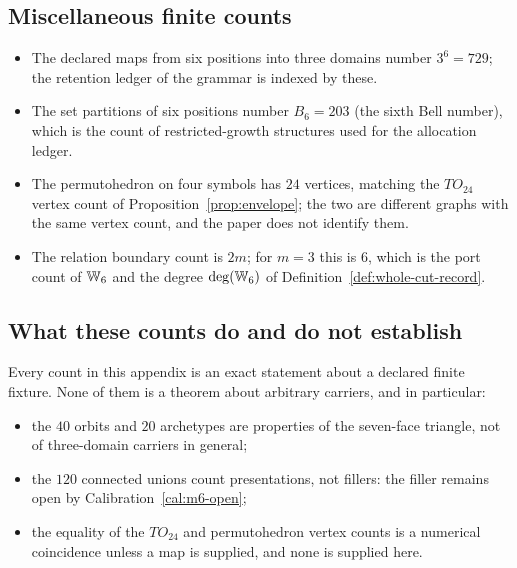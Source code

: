 \subsection{Miscellaneous finite counts}

\begin{itemize}
\item The declared maps from six positions into three domains number $3^{6}=729$; the
  retention ledger of the grammar is indexed by these.
\item The set partitions of six positions number $B_6=203$ (the sixth Bell number), which is
  the count of restricted-growth structures used for the allocation ledger.
\item The permutohedron on four symbols has $24$ vertices, matching the $TO_{24}$ vertex
  count of Proposition~\ref{prop:envelope}; the two are different graphs with the same vertex
  count, and the paper does not identify them.
\item The relation boundary count is $2m$; for $m=3$ this is $6$, which is the port count of
  $\mathbb{W}_6$ and the degree $\deg(\mathbb{W}_6)$ of Definition~\ref{def:whole-cut-record}.
\end{itemize}

\subsection{What these counts do and do not establish}

Every count in this appendix is an exact statement about a declared finite fixture.  None of
them is a theorem about arbitrary carriers, and in particular:

\begin{itemize}
\item the $40$ orbits and $20$ archetypes are properties of the seven-face triangle, not of
  three-domain carriers in general;
\item the $120$ connected unions count presentations, not fillers: the filler remains open by
  Calibration~\ref{cal:m6-open};
\item the equality of the $TO_{24}$ and permutohedron vertex counts is a numerical coincidence
  unless a map is supplied, and none is supplied here.
\end{itemize}

